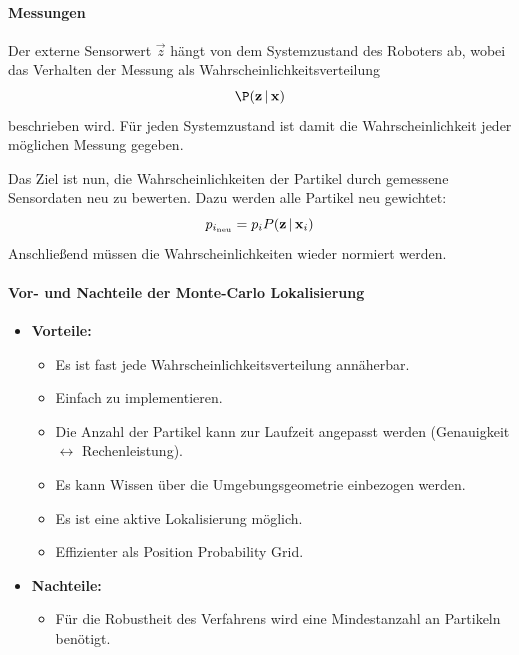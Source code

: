 				\paragraph{Messungen}
					Der externe Sensorwert \( \vec{z} \) hängt von dem Systemzustand des Roboters ab, wobei das Verhalten der Messung als Wahrscheinlichkeitsverteilung
					\begin{equation*}
						\P(\vec{z} \given \vec{x})
					\end{equation*}
					beschrieben wird. Für jeden Systemzustand ist damit die Wahrscheinlichkeit jeder möglichen Messung gegeben.
					
					Das Ziel ist nun, die Wahrscheinlichkeiten der Partikel durch gemessene Sensordaten neu zu bewerten. Dazu werden alle Partikel neu gewichtet:
					\begin{equation*}
						p_{i_\text{neu}} = p_i P(\boldsymbol{\mathrm{z}} \,\vert\, \boldsymbol{\mathrm{x}}_i)
					\end{equation*}
					Anschließend müssen die Wahrscheinlichkeiten wieder normiert werden.
				
				\paragraph{Vor- und Nachteile der Monte-Carlo Lokalisierung}
					\begin{itemize}
						\item \textbf{Vorteile:}
							\begin{itemize}
								\item Es ist fast jede Wahrscheinlichkeitsverteilung annäherbar.
								\item Einfach zu implementieren.
								\item Die Anzahl der Partikel kann zur Laufzeit angepasst werden (Genauigkeit \(\leftrightarrow\) Rechenleistung).
								\item Es kann Wissen über die Umgebungsgeometrie einbezogen werden.
								\item Es ist eine aktive Lokalisierung möglich.
								\item Effizienter als Position Probability Grid.
							\end{itemize}
						\item \textbf{Nachteile:}
							\begin{itemize}
								\item Für die Robustheit des Verfahrens wird eine Mindestanzahl an Partikeln benötigt.
							\end{itemize}
					\end{itemize}

